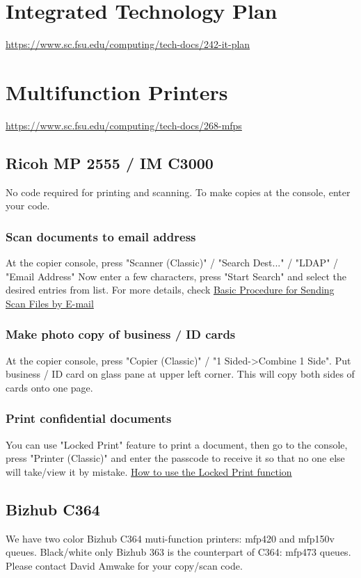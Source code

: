 \documentclass[12pt,a4paper]{article}
\begin{document}
\section{Integrated Technology Plan}
\url{https://www.sc.fsu.edu/computing/tech-docs/242-it-plan}

\section{Multifunction Printers}
\url{https://www.sc.fsu.edu/computing/tech-docs/268-mfps}

\subsection*{Ricoh MP 2555 / IM C3000}
No code required for printing and scanning. To make copies at the console, enter your code.
\subsubsection*{Scan documents to email address}
At the copier console, press "Scanner (Classic)" / "Search Dest..." / "LDAP" / "Email Address"
Now enter a few characters, press "Start Search" and select the desired entries from list.
For more details, check \href{http://support.ricoh.com/bb_v1oi/html/oi/rc3/model/mp25/manual/e-mail.htm}{Basic Procedure for Sending Scan Files by E-mail}
\subsubsection*{Make photo copy of business / ID cards}
At the copier console, press "Copier (Classic)" / "1 Sided->Combine 1 Side". Put business / ID card on glass pane at upper left corner. This will copy both sides of cards onto one page.
\subsubsection*{Print confidential documents}
You can use "Locked Print" feature to print a document, then go to the console, press "Printer (Classic)" and enter the passcode to receive it so that no one else will take/view it by mistake.
\href{http://support.ricoh.com/bb_v1oi/html/oi/r-c3/model/mpc300/manual/printer/locked.htm}{How to use the Locked Print function}

\subsection*{Bizhub C364}
We have two color Bizhub C364 muti-function printers: mfp420 and mfp150v queues. Black/white only Bizhub 363 is the counterpart of C364: mfp473 queues. Please contact David Amwake for your copy/scan code.
\end{document}
